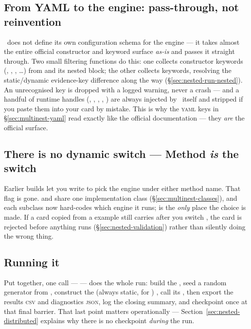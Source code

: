 \subsection{From YAML to the engine: pass-through, not reinvention}
\label{sec:multinest-yaml-bridge}

\Jtwo\ does not define its own configuration schema for the engine --- it takes
almost the entire official  constructor and  keyword
surface \emph{as-is} and passes it straight through. Two small filtering functions do
this: one collects constructor keywords (, ,
, \ldots) from  and its nested  block;
the other collects  keywords, resolving the static/dynamic
evidence-key difference along the way (\S\ref{sec:nested-run-nested}). An unrecognised
key is dropped with a logged warning, never a crash --- and a handful of runtime
handles (, , , ,
) are always injected by \Jtwo\ itself and stripped if you paste them into
your card by mistake. This is why the \textsc{yaml} keys in
\S\ref{sec:multinest-yaml} read exactly like the official 
documentation --- they \emph{are} the official surface.

\subsection{There is no dynamic switch --- Method \emph{is} the switch}
\label{sec:multinest-no-switch}

Earlier builds let you write  to pick the engine
under either method name. That flag is gone.  and
 share one implementation class (\S\ref{sec:multinest-classes}), and
each subclass now hard-codes which engine it runs;  is the
\emph{only} place the choice is made. If a card copied from a 
example still carries  after you switch
, the card is rejected before anything runs
(\S\ref{sec:nested-validation}) rather than silently doing the wrong thing.

\subsection{Running it}
\label{sec:multinest-run-loop}

Put together, one call ---  --- does the whole run: build the
, seed a  random generator from
, construct the (always static, for )
, call its , then export the results
\textsc{csv} and diagnostics \textsc{json}, log the closing summary, and checkpoint
once at that final barrier. That last point matters operationally ---
Section~\ref{sec:nested-distributed} explains why there is no checkpoint
\emph{during} the run.

